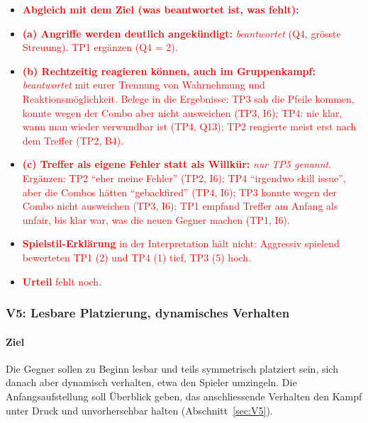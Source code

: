 \documentclass[../Main.tex]{subfiles}
\begin{document}
\begin{itemize}[leftmargin=1.5cm]
    \item \textcolor{red}{\textbf{Abgleich mit dem Ziel (was beantwortet ist, was fehlt):}}
    \item \textcolor{red}{\textbf{(a) Angriffe werden deutlich angekündigt:} \emph{beantwortet} (Q4, grösste Streuung). TP1 ergänzen (Q4 = 2).}
    \item \textcolor{red}{\textbf{(b) Rechtzeitig reagieren können, auch im Gruppenkampf:} \emph{beantwortet} mit eurer Trennung von Wahrnehmung und Reaktionsmöglichkeit. Belege in die Ergebnisse: TP3 sah die Pfeile kommen, konnte wegen der Combo aber nicht ausweichen (TP3, I6); TP4: nie klar, wann man wieder verwundbar ist (TP4, Q13); TP2 reagierte meist erst nach dem Treffer (TP2, B4).}
    \item \textcolor{red}{\textbf{(c) Treffer als eigene Fehler statt als Willkür:} \emph{nur TP5 genannt}. Ergänzen: TP2 \enquote{eher meine Fehler} (TP2, I6); TP4 \enquote{irgendwo skill issue}, aber die Combos hätten \enquote{gebackfired} (TP4, I6); TP3 konnte wegen der Combo nicht ausweichen (TP3, I6); TP1 empfand Treffer am Anfang als unfair, bis klar war, was die neuen Gegner machen (TP1, I6).}
    \item \textcolor{red}{\textbf{Spielstil-Erklärung} in der Interpretation hält nicht: Aggressiv spielend bewerteten TP1 (2) und TP4 (1) tief, TP3 (5) hoch.}
    \item \textcolor{red}{\textbf{Urteil} fehlt noch.}
\end{itemize}

\subsubsection{V5: Lesbare Platzierung, dynamisches Verhalten}

\paragraph{Ziel}
Die Gegner sollen zu Beginn lesbar und teils symmetrisch platziert sein, sich danach aber dynamisch verhalten, etwa den Spieler umzingeln. Die Anfangsaufstellung soll Überblick geben, das anschliessende Verhalten den Kampf unter Druck und unvorhersehbar halten (Abschnitt~\ref{sec:V5}).
\end{document}
